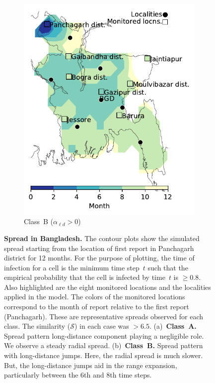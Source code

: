 \documentclass[11pt]{article}
\newcommand{\similarity}{\mathcal{S}}
\newcommand{\ald}{\alpha_{\ell d}}
\theoremstyle{definition}
\begin{document}
\begin{figure}[!ht]
\begin{subfigure}[b]{.47\textwidth}
\end{subfigure}\hspace{.5cm}
\begin{subfigure}[b]{.47\textwidth}
    \includegraphics[width=\textwidth]{../cellular_automata/results/contour/BGD_model-B_m1_l3.pdf}
    \caption{Class~B ($\ald>0$) \label{fig:bgdClassB1}}
\end{subfigure}
\caption{\textbf{Spread in Bangladesh.} The contour plots show the
simulated spread starting from the location of first report in Panchagarh
district for 12 months. For the purpose of plotting, the time of infection
for a cell is the minimum time step~$t$ such that the empirical probability
that the cell is infected by time~$t$ is $\ge0.8$. Also highlighted are the
eight monitored locations and the localities applied in the model. The
colors of the monitored locations correspond to the month of report
relative to the first report (Panchagarh). These are representative spreads
observed for each class. The similarity ($\similarity$) in each case was $>6.5$.
(a)~\textbf{Class~A.} Spread pattern long-distance component playing a
negligible role. We
observe a steady radial spread.  (b)~\textbf{Class~B.} Spread pattern with
long-distance jumps. Here, the radial spread is much slower. But, the
long-distance jumps aid in the range expansion, particularly between the
6th and 8th time steps.}
\end{figure}
\end{document}

